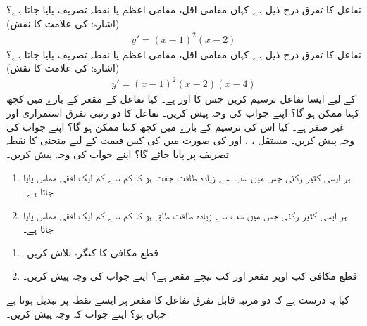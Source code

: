 تفاعل  کا تفرق درج ذیل ہے۔کہاں مقامی اقل، مقامی اعظم یا  نقطہ تصریف پایا جاتا ہے؟(اشارہ:  کی علامت کا نقش) 
\begin{align*}
y'=(x-1)^2(x-2)
\end{align*}
تفاعل  کا تفرق درج ذیل ہے۔کہاں مقامی اقل، مقامی اعظم یا  نقطہ تصریف پایا جاتا ہے؟(اشارہ:  کی علامت کا نقش) 
\begin{align*}
y'=(x-1)^2(x-2)(x-4)
\end{align*}
 کے لیے ایسا تفاعل  ترسیم کرین جس کا  اور  ہے۔ کیا تفاعل کے مقعر کے بارے میں کچھ کہنا ممکن ہو گا؟ اپنے جواب کی وجہ پیش کریں۔
تفاعل  کا دو رتبی تفرق استمراری اور غیر صفر ہے۔ کیا اس کی ترسیم کے بارے میں کچھ کہنا ممکن ہو گا؟ اپنے جواب کی وجہ پیش کریں۔
مستقل ، ،  اور  کی صورت میں  کی کس قیمت کے لیے منحنی  کا نقطہ تصریف  پر پایا جائے گا؟ اپنے جواب کی وجہ پیش کریں۔
\begin{enumerate}
\item
ہر ایسی  کثیر رکنی جس میں سب سے زیادہ طاقت جفت ہو  کا کم سے کم ایک افقی مماس پایا جاتا ہے۔
\item
ہر ایسی کثیر رکنی جس میں سب سے زیادہ طاقت طاق ہو  کا کم سے کم ایک افقی مماس پایا جاتا ہے۔
\end{enumerate}
\begin{enumerate}
\item
قطع مکافی  کا کنگرہ تلاش کریں۔
\item
قطع مکافی کب اوپر مقعر اور کب  نیچے مقعر ہے؟ اپنے جواب کی وجہ پیش کریں۔
\end{enumerate}
کیا یہ درست ہے کہ دو مرتبہ قابل تفرق تفاعل  کا مقعر ہر ایسے نقطہ پر تبدیل ہوتا ہے جہاں  ہو؟ اپنے جواب کہ وجہ پیش کریں۔
